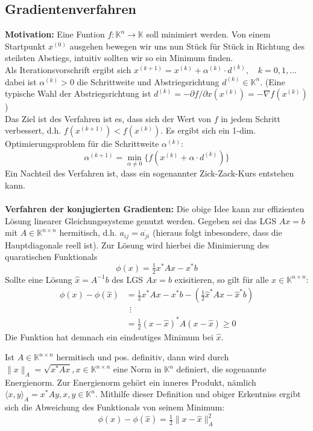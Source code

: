 \documentclass{article}
\begin{document}
\subsection{Gradientenverfahren}
\textbf{Motivation:} Eine Funtion $f:\mathbb{K}^n\rightarrow \mathbb{K}$ soll minimiert werden. 
Von einem Startpunkt $x^{(0)}$ ausgehen bewegen wir uns nun Stück für Stück in Richtung des steilsten Abstiegs, 
intuitiv sollten wir so ein Minimum finden. \\
Als Iterationsvorschrift ergibt sich $x^{(k+1)} = x^{(k)}+\alpha^{(k)}\cdot d^{(k)}, \quad k=0,1,\dotsc$\\
dabei ist $\alpha^{(k)}>0$ die Schrittweite und Abstriegsrichtung $d^{(k)}\in\mathbb{K}^n$.
(Eine typische Wahl der Abstriegsrichtung ist $d^{(k)}=-\partial f/\partial x (x^{(k)})=-\nabla f(x^{(k)})$) \\
Das Ziel ist des Verfahren ist es, dass sich der Wert von $f$ in jedem Schritt verbessert, 
d.h. $f(x^{(k+1)})<f(x^{(k)})$. 
Es ergibt sich ein 1-dim. Optimierungsproblem für die Schrittweite $\alpha^{(k)}$:
\[\alpha^{(k+1)}=\min_{\alpha\neq 0}\{f(x^{(k)}+\alpha\cdot d^{(k)})\}\]
Ein Nachteil des Verfahren ist, dass ein sogenannter \glqq Zick-Zack-Kurs\grqq{} entstehen kann. \\ \\
\textbf{Verfahren der konjugierten Gradienten:} Die obige Idee kann zur effizienten Lösung 
linearer Gleichungssysteme genutzt werden.
Gegeben sei das LGS $Ax=b$ mit $A\in\mathbb{K}^{n\times n}$ hermitisch, 
d.h. $a_{ij}=\overline{a_{ji}}$ (hieraus folgt inbesondere, dass die Hauptdiagonale reell ist). 
Zur Lösung wird hierbei die Minimierung des quaratischen Funktionals 
\[\phi(x)=\tfrac{1}{2}x^* Ax - x^*b\]
Sollte eine Lösung $\hat{x}=A^{-1}b$ des LGS $Ax=b$ exisitieren, so gilt für alle $x\in\mathbb{K}^{n\times n}$:
\begin{align*}
    \phi(x)-\phi(\hat{x}) &= \tfrac{1}{2}x^* Ax - x^*b - (\tfrac{1}{2}\hat{x}^* A\hat{x} - \hat{x}^*b) \\
    &\ \ \vdots \\
    &= \tfrac{1}{2} (x-\hat{x})^*A(x-\hat{x}) \geq 0
\end{align*}
Die Funktion hat demnach ein eindeutiges Minimum bei $\hat{x}$.
\begin{defbox}
    Ist $A\in\mathbb{K}^{n\times n}$ hermitisch und pos. definitiv, dann wird durch $\|x\|_A=\sqrt{x^*Ax}, 
    x\in\mathbb{K}^{n\times n}$ eine Norm in $\mathbb{K}^n$ definiert, die sogenannte Energienorm. 
    Zur Energienorm gehört ein inneres Produkt, nämlich $\langle x,y\rangle_A=x^*Ay, x,y\in\mathbb{K}^n$.
    Mithilfe dieser Definition und obiger Erkentniss ergibt sich die Abweichung des Funktionals von seinem Minimum:
    \[\phi(x)-\phi(\hat{x}) = \tfrac{1}{2}\|x-\hat{x}\|^2_A\]
\end{defbox}
\end{document}
